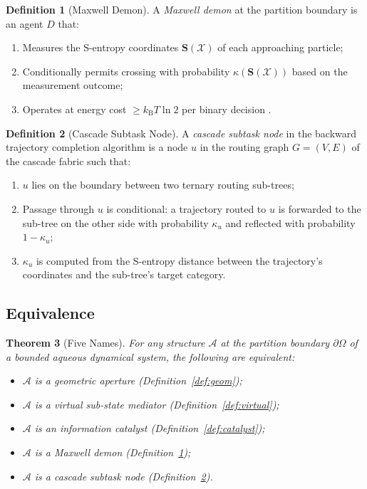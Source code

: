 \documentclass[11pt,twocolumn,a4paper]{article}
\newtheorem{theorem}{Theorem}[section]
\theoremstyle{definition}
\newtheorem{definition}[theorem]{Definition}
\theoremstyle{remark}
\newcommand{\kB}{k_{\mathrm{B}}}
\newcommand{\kap}{\kappa}
\newcommand{\Sent}{\bm{S}}
\begin{document}
\begin{definition}[Maxwell Demon]
\label{def:demon}
A \emph{Maxwell demon} at the partition boundary is an agent $D$ that:
\begin{enumerate}[nosep, label=(\roman*)]
\item Measures the S-entropy coordinates $\Sent(\mathcal{X})$ of each approaching
  particle;
\item Conditionally permits crossing with probability $\kap(\Sent(\mathcal{X}))$
  based on the measurement outcome;
\item Operates at energy cost $\geq \kB T \ln 2$ per binary decision
  \citep{szilard1929, landauer1961}.
\end{enumerate}
\end{definition}

\begin{definition}[Cascade Subtask Node]
\label{def:subtask}
A \emph{cascade subtask node} in the backward trajectory completion algorithm
is a node $u$ in the routing graph $G = (V, E)$ of the cascade fabric such
that:
\begin{enumerate}[nosep, label=(\roman*)]
\item $u$ lies on the boundary between two ternary routing sub-trees;
\item Passage through $u$ is conditional: a trajectory routed to $u$
  is forwarded to the sub-tree on the other side with probability $\kap_u$
  and reflected with probability $1 - \kap_u$;
\item $\kap_u$ is computed from the S-entropy distance between the trajectory's
  coordinates and the sub-tree's target category.
\end{enumerate}
\end{definition}

\subsection{Equivalence}

\begin{theorem}[Five Names]
\label{thm:fivenames}
For any structure $\mathcal{A}$ at the partition boundary $\partial\Omega$ of a
bounded aqueous dynamical system, the following are equivalent:
\begin{itemize}[nosep]
\item[(\textbf{G})] $\mathcal{A}$ is a geometric aperture (Definition~\ref{def:geom});
\item[(\textbf{V})] $\mathcal{A}$ is a virtual sub-state mediator
  (Definition~\ref{def:virtual});
\item[(\textbf{I})] $\mathcal{A}$ is an information catalyst
  (Definition~\ref{def:catalyst});
\item[(\textbf{M})] $\mathcal{A}$ is a Maxwell demon (Definition~\ref{def:demon});
\item[(\textbf{S})] $\mathcal{A}$ is a cascade subtask node
  (Definition~\ref{def:subtask}).
\end{itemize}
\end{theorem}
\end{document}
